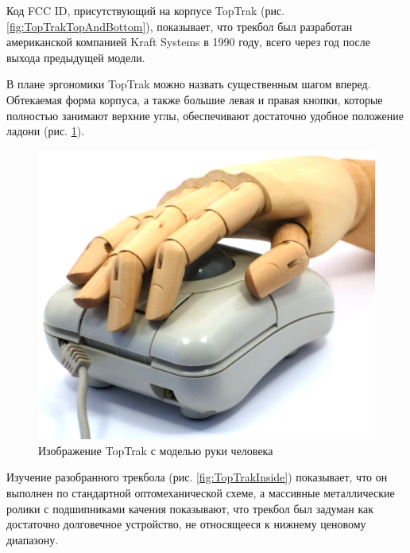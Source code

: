 \documentclass[11pt, a4paper]{article}
\begin{document}
Код FCC ID, присутствующий на корпусе TopTrak (рис. \ref{fig:TopTrakTopAndBottom}), показывает, что трекбол был разработан американской компанией Kraft Systems в 1990 году, всего через год после выхода предыдущей модели.

В плане эргономики TopTrak можно назвать существенным шагом вперед. Обтекаемая
форма корпуса, а также большие левая и правая кнопки, которые полностью занимают
верхние углы, обеспечивают достаточно удобное положение ладони (рис. \ref{fig:TopTrakHand}).


\begin{figure}[h]
    \centering
    \includegraphics[scale=0.45]{1990_kraft_toptrack/hand_60.jpg}
    \caption{Изображение TopTrak с моделью руки человека}
    \label{fig:TopTrakHand}
\end{figure}



Изучение разобранного трекбола (рис. \ref{fig:TopTrakInside}) показывает, что он выполнен по стандартной оптомеханической схеме, а массивные металлические ролики с подшипниками качения показывают, что трекбол был задуман как достаточно долговечное устройство, не относящееся к нижнему ценовому диапазону.
\end{document}
